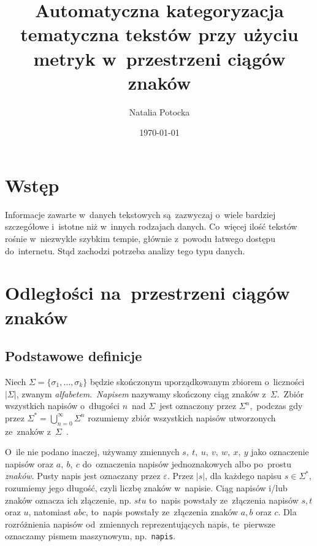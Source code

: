 \documentclass{praca1}
\author{Natalia Potocka}
\title{Automatyczna kategoryzacja tematyczna tekstów przy użyciu metryk w~przestrzeni ciągów znaków}
\date{\today}
\begin{document}
%
%
%
%


  \tableofcontents

\chapter{Wstęp}

Informacje zawarte w~danych tekstowych są~zazwyczaj o~wiele bardziej szczegółowe i~istotne niż w~innych rodzajach danych. Co~więcej ilość tekstów rośnie w~niezwykle szybkim tempie, głównie z~powodu łatwego dostępu do~internetu. Stąd zachodzi potrzeba analizy tego typu danych.


\chapter{Odległości na~przestrzeni ciągów znaków}
\label{metryki-na-przestrzeni-ciagow-znakow}


\section{Podstawowe definicje}


\begin{definition}
Niech  $\Sigma = \{\sigma_1, \ldots, \sigma_k\}$ będzie skończonym uporządkowanym zbiorem o~liczności $|\Sigma|$, zwanym \emph{alfabetem}.~\emph{Napisem} nazywamy skończony ciąg znaków z~$\Sigma$.~Zbiór wszystkich napisów o~długości $n$~nad $\Sigma$~jest oznaczony przez $\Sigma^n$,~podczas gdy przez $\Sigma^* = \bigcup_{n=0}^{\infty}\Sigma^n$ rozumiemy zbiór wszystkich napisów utworzonych ze~znaków z~$\Sigma$~\cite{Boytsov2011:indexingmethods}.
\end{definition}

O~ile nie podano inaczej, używamy zmiennych $s,\ t,\ u,\ v,\ w,\ x,\ y$ jako oznaczenie napisów oraz $a,\ b,\ c$ do~oznaczenia napisów jednoznakowych albo po~prostu \emph{znaków}. Pusty napis jest oznaczany przez $\varepsilon$. Przez $|s|$, dla każdego napisu $s \in \Sigma^*$, rozumiemy jego długość, czyli liczbę znaków w~napisie. Ciąg napisów i/lub znaków oznacza ich złączenie, np. $stu$ to~napis powstały ze~złączenia napisów $s, t$ oraz $u$, natomiast $abc$, to~napis powstały ze~złączenia znaków $a, b$ oraz $c$. Dla rozróżnienia napisów od~zmiennych reprezentujących napis, te~pierwsze oznaczamy pismem maszynowym, np.~\verb|napis|.
\end{document}
